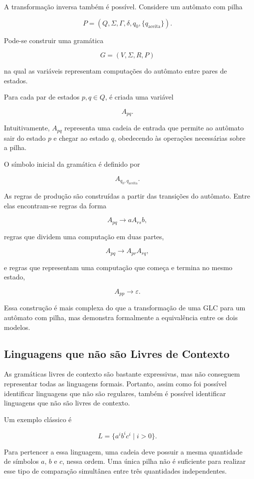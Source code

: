 \documentclass[
  brazilian,
  letterpaper,
]{book}
\theoremstyle{plain}
\theoremstyle{definition}
\theoremstyle{remark}
\begin{document}
A transformação inversa também é possível. Considere um autômato com
pilha

\[
P=(Q,\Sigma,\Gamma,\delta,q_0,\{q_{\mathrm{aceita}}\}).
\]

Pode-se construir uma gramática

\[
G=(V,\Sigma,R,P)
\]

na qual as variáveis representam computações do autômato entre pares de
estados.

Para cada par de estados \(p,q\in Q\), é criada uma variável

\[
A_{pq}.
\]

Intuitivamente, \(A_{pq}\) representa uma cadeia de entrada que permite
ao autômato sair do estado \(p\) e chegar ao estado \(q\), obedecendo às
operações necessárias sobre a pilha.

O símbolo inicial da gramática é definido por

\[
A_{q_0,q_{\mathrm{aceita}}}.
\]

As regras de produção são construídas a partir das transições do
autômato. Entre elas encontram-se regras da forma

\[
A_{pq}\rightarrow aA_{rs}b,
\]

regras que dividem uma computação em duas partes,

\[
A_{pq}\rightarrow A_{pr}A_{rq},
\]

e regras que representam uma computação que começa e termina no mesmo
estado,

\[
A_{pp}\rightarrow\varepsilon.
\]

Essa construção é mais complexa do que a transformação de uma GLC para
um autômato com pilha, mas demonstra formalmente a equivalência entre os
dois modelos.

\subsection{Linguagens que não são Livres de
Contexto}\label{linguagens-que-nuxe3o-suxe3o-livres-de-contexto}

As gramáticas livres de contexto são bastante expressivas, mas não
conseguem representar todas as linguagens formais. Portanto, assim como
foi possível identificar linguagens que não são regulares, também é
possível identificar linguagens que não são livres de contexto.

Um exemplo clássico é

\[
L=\{a^ib^ic^i\mid i>0\}.
\]

Para pertencer a essa linguagem, uma cadeia deve possuir a mesma
quantidade de símbolos \(a\), \(b\) e \(c\), nessa ordem. Uma única
pilha não é suficiente para realizar esse tipo de comparação simultânea
entre três quantidades independentes.
\end{document}
